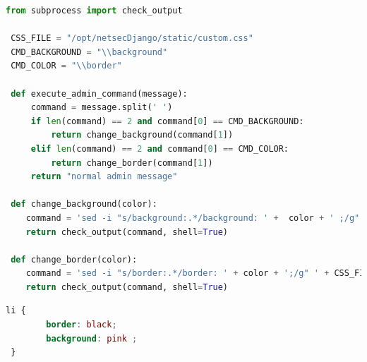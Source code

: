 \documentclass[12pt,a4paper]{article}
\newcommand{\code}[1]{\texttt{#1}}
\begin{document}
\begin{lstlisting}[caption={Excerpt of the command injection vulnerability implementation},label={lst:admin_command}, language=python] 
 from subprocess import check_output

 CSS_FILE = "/opt/netsecDjango/static/custom.css"
 CMD_BACKGROUND = "\\background"
 CMD_COLOR = "\\border"

 def execute_admin_command(message):
     command = message.split(' ')
     if len(command) == 2 and command[0] == CMD_BACKGROUND:
         return change_background(command[1])
     elif len(command) == 2 and command[0] == CMD_COLOR:
         return change_border(command[1])
     return "normal admin message"

 def change_background(color):
    command = 'sed -i "s/background:.*/background: ' +  color + ' ;/g" ' + CSS_FILE
    return check_output(command, shell=True)

 def change_border(color):
    command = 'sed -i "s/border:.*/border: ' + color + ';/g" ' + CSS_FILE
    return check_output(command, shell=True)
\end{lstlisting}

\begin{lstlisting}[caption={\code{custom.css} file, defining the colors of a chat message},label={lst:css_file}, language=CSS] 
 li {
        border: black;
        background: pink ;
 }
\end{lstlisting}
\end{document}
